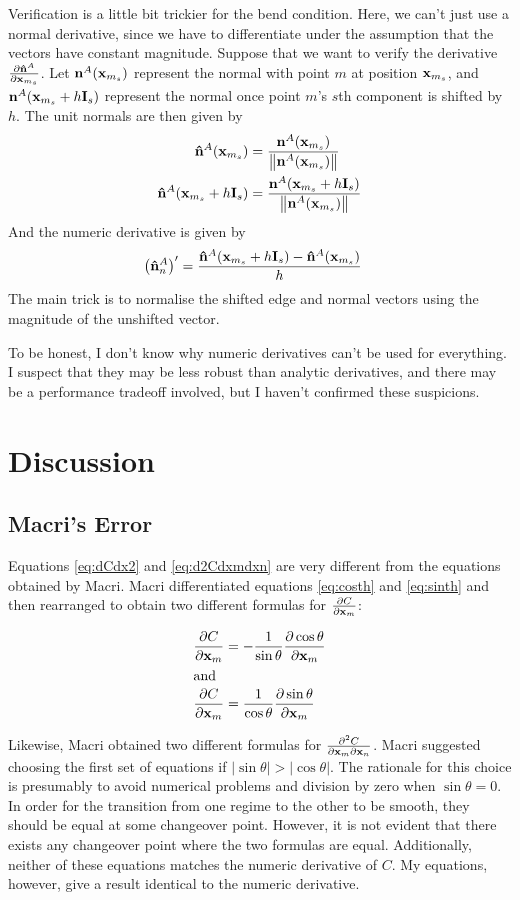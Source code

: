 \documentclass[twocolumn]{article}
\newcommand{\abs}[1]{\lvert#1\rvert}
\newcommand{\norm}[1]{\begin{Vmatrix}#1\end{Vmatrix}}
\newcommand{\pfrac}[2]{
    \frac{\partial #1}{\partial #2}
}
\newcommand{\pfractwo}[3]{
    \frac{\partial^2 #1}{\partial #2 \partial #3}
}
\newcommand{\Is}{{\bf I}_s}
\newcommand{\x}{{\bf x}}
\newcommand{\xm}{\x_m}
\newcommand{\xms}{\x_{m_s}}
\newcommand{\xn}{\x_n}
\newcommand{\n}{{\bf n}}
\newcommand{\nhat}{{\bf {\hat n}}}
\begin{document}
Verification is a little bit trickier for the bend condition. Here, we can't
just use a normal derivative, since we have to differentiate under the
assumption that the vectors have constant magnitude. Suppose that we want
to verify the derivative $\pfrac{\nhat^A}{\xms}$. Let $\n^A(\xms)$ represent
the normal with point $m$ at position $\xms$, and $\n^A(\xms + h\Is)$
represent the normal once point $m$'s $s$th component is shifted by $h$.
The unit normals are then given by
\begin{align*}
\nhat^A(\xms) &= \frac{\n^A(\xms)}{\norm{\n^A(\xms)}} \\
\nhat^A(\xms + h\Is) &= \frac{\n^A(\xms + h\Is)}{\norm{\n^A(\xms)}}
\end{align*}
And the numeric derivative is given by
\begin{align*}
\left({\nhat^{A}}_n\right)' &= \frac{\nhat^A(\xms + h\Is) - \nhat^A(\xms)}{h}
\end{align*}
The main trick is to normalise the shifted edge and normal vectors using the
magnitude of the unshifted vector.

To be honest, I don't know why numeric derivatives can't be used for everything.
I suspect that they may be less robust than analytic derivatives, and there
may be a performance tradeoff involved, but I haven't confirmed these
suspicions. %

\section{Discussion}

\subsection{Macri's Error}

Equations \eqref{eq:dCdx2} and \eqref{eq:d2Cdxmdxn} are very different
from the equations obtained by Macri. Macri differentiated equations
\eqref{eq:costh} and \eqref{eq:sinth}
and then rearranged to obtain two different formulas for $\pfrac{C}{\xm}$:

\begin{align*}
\pfrac{C}{\xm} &=
   -\frac{1}{\sin \theta}
   \pfrac{\cos \theta}{\xm} \\
\intertext{and}
\pfrac{C}{\xm} &=
   \frac{1}{\cos \theta}
   \pfrac{\sin \theta}{\xm}
\end{align*}

Likewise, Macri obtained two different formulas for $\pfractwo{C}{\xm}{\xn}$.
Macri suggested choosing the first set of equations if
$\abs{\sin \theta} > \abs{\cos \theta}$. The rationale
for this choice is presumably to avoid numerical problems and division by zero
when $\sin \theta=0$. In order for the transition from one regime to the other
to be smooth, they should be equal at some changeover point. However, it is
not evident that there exists any changeover point where the two formulas are
equal. Additionally, neither of these equations matches
the numeric derivative of $C$. My equations, however, give a result
identical to the numeric derivative.
\end{document}
